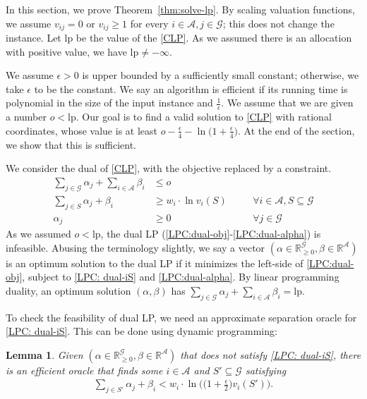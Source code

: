 \documentclass[10pt,a4paper]{article}
\newtheorem{lemma}[theorem]{Lemma}
\theoremstyle{definition}
\theoremstyle{plain}
\newcommand\calA{{\mathcal{A}}}
\newcommand\calG{{\mathcal{G}}}
\newcommand{\R}{{\mathbb{R}}}
\newcommand{\lp}{\mathrm{lp}}
\begin{document}
    In this section, we prove Theorem~\ref{thm:solve-lp}. By scaling valuation functions, we assume $v_{ij} = 0$ or $v_{ij} \geq 1$ for every $i \in \calA, j \in \calG$; this does not change the instance. Let $\lp$ be the value of the \eqref{CLP}. As we assumed there is an allocation with positive value, we have $\lp \neq -\infty$. 
    
    
    We assume $\epsilon > 0$ is upper bounded by a sufficiently small constant; otherwise, we take $\epsilon$ to be the constant. We say an algorithm is efficient if its running time is polynomial in the size of the input instance and $\frac1\epsilon$. We assume that we are given a number $o < \lp$. Our goal is to find a valid solution to \eqref{CLP} with rational coordinates, whose value is at least $o - \frac\epsilon 4 - \ln\big(1 + \frac\epsilon 4\big)$. At the end of the section, we show that this is sufficient. \medskip

    We consider the dual of \eqref{CLP}, with the objective replaced by a constraint. 
    \begin{align}
        \sum_{j \in \calG}\alpha_j + \sum_{i \in \calA} \beta_i &\leq o \label{LPC:dual-obj}\\
        \sum_{j \in S} \alpha_j + \beta_i &\geq w_i \cdot \ln v_i(S) &\quad &\forall i \in \calA, S \subseteq \calG \label{LPC: dual-iS}\\
        \alpha_j &\geq 0 &\quad &\forall j \in \calG \label{LPC:dual-alpha} 
    \end{align}
    As we assumed $o < \lp$, the dual LP (\ref{LPC:dual-obj}-\ref{LPC:dual-alpha}) is infeasible. Abusing the terminology slightly, we say a vector $(\alpha \in \R_{\geq 0}^\calG, \beta \in \R^{\calA})$ is an optimum solution to the dual LP if it minimizes the left-side of \eqref{LPC:dual-obj}, subject to \eqref{LPC: dual-iS} and \eqref{LPC:dual-alpha}. By linear programming duality, an optimum solution $(\alpha, \beta)$ has $\sum_{j \in \calG}\alpha_j + \sum_{i \in \calA} \beta_i=\lp$. 

    To check the feasibility of dual LP, we need an approximate separation oracle for \eqref{LPC: dual-iS}. This can be done using dynamic programming: 
    \begin{lemma}
        \label{lemma:oracle}
        Given $(\alpha \in \R_{\geq 0}^\calG, \beta \in \R^\calA)$ that does not satisfy \eqref{LPC: dual-iS}, there is an efficient oracle that finds some $i \in \calA$ and $S' \subseteq \calG$ satisfying 
    \begin{align}
        \sum_{j \in S'} \alpha_j + \beta_i < w_i \cdot \ln \Big(\big(1+\frac\epsilon2\big)v_i(S')\Big). \label{inequ:S'}
    \end{align}
  
    \end{lemma}
\end{document}

